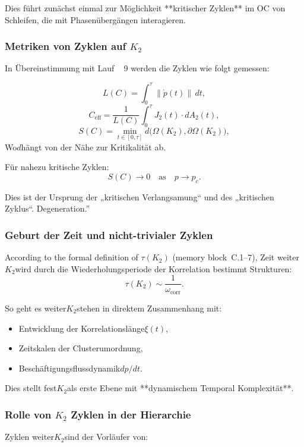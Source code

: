 Dies führt zunächst einmal zur Möglichkeit **kritischer Zyklen**
im OC von Schleifen, die mit Phasenübergängen interagieren.

\subsubsection{Metriken von Zyklen auf \texorpdfstring{$K_2$}{K_2}}

In Übereinstimmung mit Lauf ~ 9 werden die Zyklen wie folgt gemessen:

\[
L(C)
  = \int_0^\tau \|\dot{p}(t)\|\, dt,
\]
\[
  C_{\mathrm{eff}}
  = \frac{1}{L(C)} \int_0^\tau J_2(t)\cdot dA_2(t),
\]
\[
  S(C) = \min_{t\in[0,\tau]} d\bigl(\Omega(K_2),\partial\Omega(K_2)\bigr),
\]
Wo$d$hängt von der Nähe zur Kritikalität ab.

Für nahezu kritische Zyklen:
\[
  S(C) \to 0 \quad \text{as} \quad p\to p_c.
\]

Dies ist der Ursprung der „kritischen Verlangsamung“ und des „kritischen Zyklus“.
Degeneration.''

\subsubsection{Geburt der Zeit und nicht-trivialer Zyklen}

According to the formal definition of $\tau(K_2)$ (memory block~C.1–7),
Zeit weiter$K_2$wird durch die Wiederholungsperiode der Korrelation bestimmt
Strukturen:
\[
  \tau(K_2) \sim \frac{1}{\omega_{\mathrm{corr}}}.
\]

So geht es weiter$K_2$stehen in direktem Zusammenhang mit:

\begin{itemize}
  \item Entwicklung der Korrelationslänge$\xi(t)$,
  \item Zeitskalen der Clusterumordnung,
  \item Beschäftigungsflussdynamik$dp/dt$.
\end{itemize}

Dies stellt fest$K_2$als erste Ebene mit **dynamischem Temporal
Komplexität**.

\subsubsection{Rolle von \texorpdfstring{$K_2$}{K_2} Zyklen in der Hierarchie}

Zyklen weiter$K_2$sind der Vorläufer von:

